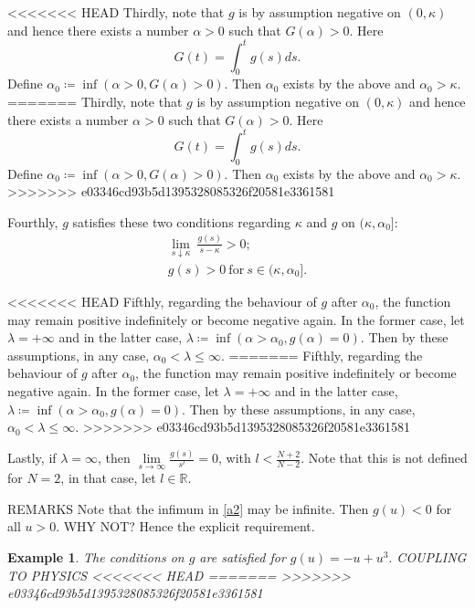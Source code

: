 {\color{gray}
<<<<<<< HEAD
Thirdly, note that $g$ is by assumption negative on $(0,\kappa)$ and hence there exists a number $\alpha>0$ such that $G(\alpha)>0$. Here $$G(t)=\int_0^t g(s)ds.$$ Define $\alpha_0\coloneqq\inf(\alpha>0,G(\alpha)>0)$. Then $\alpha_0$ exists by the above and $\alpha_0>\kappa$.
=======
Thirdly, note that $g$ is by assumption negative on $(0,\kappa)$ and hence there exists a number $\alpha>0$ such that $G(\alpha)>0$. Here $$G(t)=\int_0^t g(s)ds.$$ Define $\alpha_0\coloneqq\inf(\alpha>0,G(\alpha)>0)$. Then $\alpha_0$ exists by the above and $\alpha_0>\kappa$. 
>>>>>>> e03346cd93b5d1395328085326f20581e3361581

Fourthly, $g$ satisfies these two conditions regarding $\kappa$ and $g$ on $(\kappa,\alpha_0]$:
\begin{gather}
\label{6}\underset{s\downarrow\kappa}{\lim}~\frac{g(s)}{s-\kappa}>0;\\
g(s)>0~\text{for}~s\in(\kappa,\alpha_0].
\end{gather}

<<<<<<< HEAD
Fifthly, regarding the behaviour of $g$ after $\alpha_0$, the function may remain positive indefinitely or become negative again. In the former case, let $\lambda=+\infty$ and in the latter case, $\lambda\coloneqq\inf(\alpha>\alpha_0,g(\alpha)=0)$. Then by these assumptions, in any case, $\alpha_0<\lambda\leq\infty$.
=======
Fifthly, regarding the behaviour of $g$ after $\alpha_0$, the function may remain positive indefinitely or become negative again. In the former case, let $\lambda=+\infty$ and in the latter case, $\lambda\coloneqq\inf(\alpha>\alpha_0,g(\alpha)=0)$. Then by these assumptions, in any case, $\alpha_0<\lambda\leq\infty$. 
>>>>>>> e03346cd93b5d1395328085326f20581e3361581

Lastly, if $\lambda=\infty$, then $\underset{s\to\infty}{\lim}\frac{g(s)}{s^l}=0$, with $l<\frac{N+2}{N-2}$. Note that this is not defined for $N=2$, in that case, let $l\in\mathbb{R}$.}

{\color{red}REMARKS} Note that the infimum in \eqref{a2} may be infinite. Then $g(u)<0$ for all $u>0$. {\color{red}WHY NOT?} Hence the explicit requirement.

\newtheorem{example}{Example}
\begin{example} The conditions on $g$ are satisfied for $g(u)=-u+u^3.$ {\color{red}COUPLING TO PHYSICS}
<<<<<<< HEAD
=======
>>>>>>> e03346cd93b5d1395328085326f20581e3361581
\end{example}

